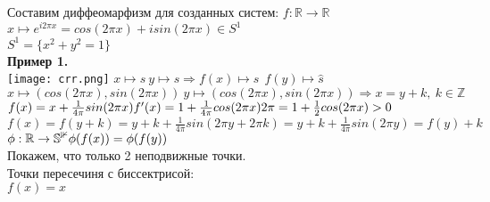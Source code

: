 \documentclass[12pt,a4paper]{article}
\begin{document}
\newpage
Составим диффеомарфизм для созданных систем:
\(f:\mathbb{R}\to \mathbb{R}\)\\
\(x\mapsto e^{i2\pi x} = cos(2\pi x)+ i sin(2\pi x) \in S^1\)\\
\(S^1 = \{x^2 + y^2 =1\}\)\\
\textbf{Пример 1.}\\
\texttt{[image: crr.png]}
\(x\mapsto s \ y\mapsto s \Rightarrow f(x)\mapsto \hat{s}\ \ f(y)\mapsto \hat{s}\)\\
\(x\mapsto (cos(2\pi x), sin(2\pi x))\ y\mapsto (cos(2\pi x), sin(2\pi x)) \Rightarrow x=y+k, \ k\in \mathbb{Z}\)\\
\(f(x)= x + \frac{1}{4\pi} sin(2\pi x)\\ f'(x)=1 + \frac{1}{4\pi} cos(2\pi x)2\pi = 1+ \frac{1}{2} cos(2\pi x) >0\)\\
\(f(x)=f(y+k)= y+k+ \frac{1}{4\pi} sin(2\pi y + 2\pi k)= y+k+\frac{1}{4\pi} sin (2\pi y)=f(y)+k\)\\
\(\phi: \mathbb{R}\to \mathbb{S^1}\\ \phi(f(x))= \phi(f(y))\)\\ Покажем, что только 2 неподвижные точки.\\ Точки пересечиня с биссектрисой:\\
\(f(x)=x\)
\end{document}
